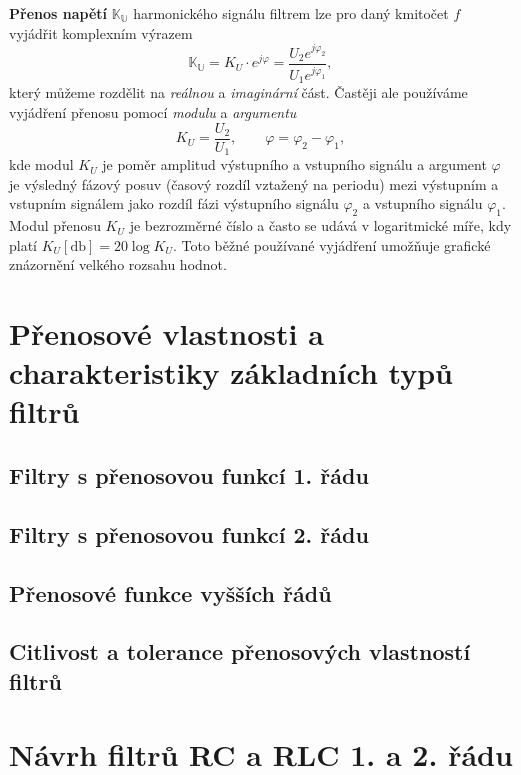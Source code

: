 {      \textbf{Přenos napětí} \(\mathbb{K_U}\) harmonického signálu filtrem lze pro daný kmitočet
      \(f\) vyjádřit komplexním výrazem
      \begin{equation}\label{aes:eq_KF_ku}
        \mathbb{K_U} = K_U\cdot e^{j\varphi} = \frac{U_2e^{j\varphi_2}}{U_1e^{j\varphi_1}},
      \end{equation}
      který můžeme rozdělit na \emph{reálnou} a \emph{imaginární} část. Častěji ale používáme
      vyjádření přenosu pomocí \emph{modulu} a \emph{argumentu}
      \begin{equation}\label{aes:eq_KF_moarg}
        K_U = \frac{U_2}{U_1}, \qquad \varphi = \varphi_2 - \varphi_1, 
      \end{equation}
      kde modul \(K_U\) je poměr amplitud výstupního a vstupního signálu a argument \(\varphi\) je
      výsledný fázový posuv (časový rozdíl vztažený na periodu) mezi výstupním a vstupním signálem
      jako rozdíl fázi výstupního signálu \(\varphi_2\) a vstupního signálu \(\varphi_1\). Modul
      přenosu \(K_U\) je bezrozměrné číslo a často se udává v logaritmické míře, kdy platí \(K_U
      [\si{\decibel}] = 20 \log{K_U}\). Toto běžné používané vyjádření umožňuje grafické znázornění
      velkého rozsahu hodnot.
  
  \section{Přenosové vlastnosti a charakteristiky základních typů filtrů}
    \subsection{Filtry s přenosovou funkcí 1. řádu}
    \subsection{Filtry s přenosovou funkcí 2. řádu}
    \subsection{Přenosové funkce vyšších řádů}
    \subsection{Citlivost a tolerance přenosových vlastností filtrů} 
  \section{Návrh filtrů RC a RLC 1. a 2. řádu}
}
